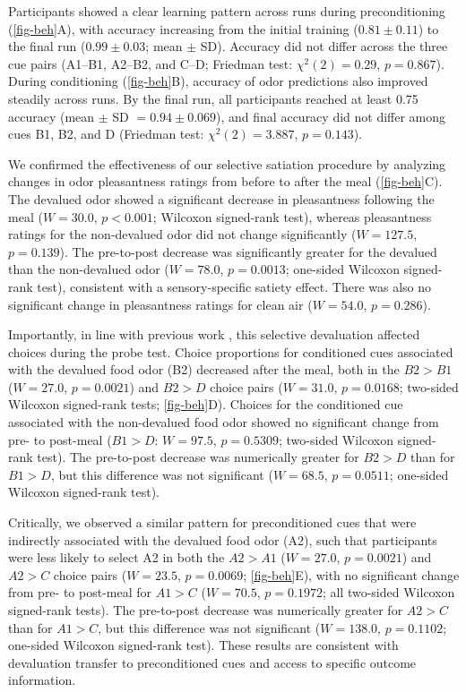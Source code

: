 \documentclass[9pt,twocolumn,twoside]{pnas-new}
\begin{document}
Participants showed a clear learning pattern across runs during preconditioning (\autoref{fig-beh}A), with accuracy increasing from the initial training ($0.81 \pm 0.11$) to the final run ($0.99 \pm 0.03$; mean $\pm$ SD). Accuracy did not differ across the three cue pairs (A1--B1, A2--B2, and C--D; Friedman test: $\chi^2(2) = 0.29$, $p = 0.867$). During conditioning (\autoref{fig-beh}B), accuracy of odor predictions also improved steadily across runs. By the final run, all participants reached at least 0.75 accuracy (mean $\pm$ SD $= 0.94 \pm 0.069$), and final accuracy did not differ among cues B1, B2, and D (Friedman test: $\chi^2(2) = 3.887$, $p = 0.143$).


We confirmed the effectiveness of our selective satiation procedure by analyzing changes in odor pleasantness ratings from before to after the meal (\autoref{fig-beh}C). The devalued odor showed a significant decrease in pleasantness following the meal ($W = 30.0$, $p < 0.001$; Wilcoxon signed-rank test), whereas pleasantness ratings for the non-devalued odor did not change significantly ($W = 127.5$, $p = 0.139$). The pre-to-post decrease was significantly greater for the devalued than the non-devalued odor ($W = 78.0$, $p = 0.0013$; one-sided Wilcoxon signed-rank test), consistent with a sensory-specific satiety effect. There was also no significant change in pleasantness ratings for clean air ($W = 54.0$, $p = 0.286$).


Importantly, in line with previous work \cite{HowRey2020,liu2025distinct}, this selective devaluation affected choices during the probe test. Choice proportions for conditioned cues associated with the devalued food odor (B2) decreased after the meal, both in the $B2>B1$ ($W = 27.0$, $p = 0.0021$) and $B2>D$ choice pairs ($W = 31.0$, $p = 0.0168$; two-sided Wilcoxon signed-rank tests; \autoref{fig-beh}D). Choices for the conditioned cue associated with the non-devalued food odor showed no significant change from pre- to post-meal ($B1>D$: $W = 97.5$, $p = 0.5309$; two-sided Wilcoxon signed-rank test). The pre-to-post decrease was numerically greater for $B2>D$ than for $B1>D$, but this difference was not significant ($W = 68.5$, $p = 0.0511$; one-sided Wilcoxon signed-rank test).

Critically, we observed a similar pattern for preconditioned cues that were indirectly associated with the devalued food odor (A2), such that participants were less likely to select A2 in both the $A2>A1$ ($W = 27.0$, $p = 0.0021$) and $A2>C$ choice pairs ($W = 23.5$, $p = 0.0069$; \autoref{fig-beh}E), with no significant change from pre- to post-meal for $A1>C$ ($W = 70.5$, $p = 0.1972$; all two-sided Wilcoxon signed-rank tests). The pre-to-post decrease was numerically greater for $A2>C$ than for $A1>C$, but this difference was not significant ($W = 138.0$, $p = 0.1102$; one-sided Wilcoxon signed-rank test). These results are consistent with devaluation transfer to preconditioned cues and access to specific outcome information.
\end{document}
